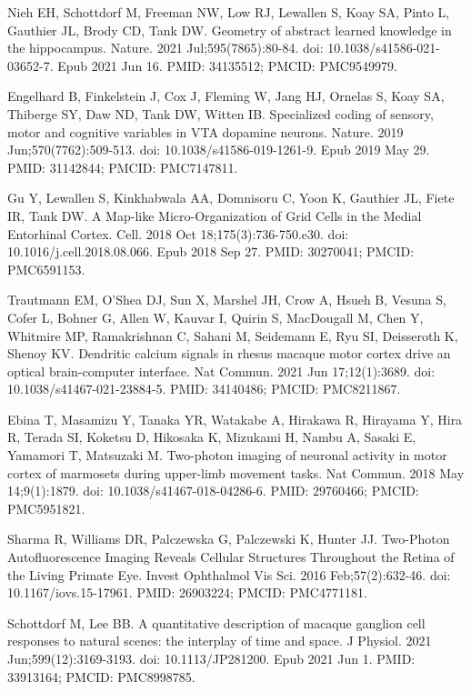 \documentclass[10pt,letterpaper]{article}
\begin{document}
\begin{thebibliography}{10}
Nieh EH, Schottdorf M, Freeman NW, Low RJ, Lewallen S, Koay SA, Pinto L, Gauthier JL, Brody CD, Tank DW. Geometry of abstract learned knowledge in the hippocampus. Nature. 2021 Jul;595(7865):80-84. doi: 10.1038/s41586-021-03652-7. Epub 2021 Jun 16. PMID: 34135512; PMCID: PMC9549979.

Engelhard B, Finkelstein J, Cox J, Fleming W, Jang HJ, Ornelas S, Koay SA, Thiberge SY, Daw ND, Tank DW, Witten IB. Specialized coding of sensory, motor and cognitive variables in VTA dopamine neurons. Nature. 2019 Jun;570(7762):509-513. doi: 10.1038/s41586-019-1261-9. Epub 2019 May 29. PMID: 31142844; PMCID: PMC7147811.

Gu Y, Lewallen S, Kinkhabwala AA, Domnisoru C, Yoon K, Gauthier JL, Fiete IR, Tank DW. A Map-like Micro-Organization of Grid Cells in the Medial Entorhinal Cortex. Cell. 2018 Oct 18;175(3):736-750.e30. doi: 10.1016/j.cell.2018.08.066. Epub 2018 Sep 27. PMID: 30270041; PMCID: PMC6591153.

Trautmann EM, O'Shea DJ, Sun X, Marshel JH, Crow A, Hsueh B, Vesuna S, Cofer L, Bohner G, Allen W, Kauvar I, Quirin S, MacDougall M, Chen Y, Whitmire MP, Ramakrishnan C, Sahani M, Seidemann E, Ryu SI, Deisseroth K, Shenoy KV. Dendritic calcium signals in rhesus macaque motor cortex drive an optical brain-computer interface. Nat Commun. 2021 Jun 17;12(1):3689. doi: 10.1038/s41467-021-23884-5. PMID: 34140486; PMCID: PMC8211867.

Ebina T, Masamizu Y, Tanaka YR, Watakabe A, Hirakawa R, Hirayama Y, Hira R, Terada SI, Koketsu D, Hikosaka K, Mizukami H, Nambu A, Sasaki E, Yamamori T, Matsuzaki M. Two-photon imaging of neuronal activity in motor cortex of marmosets during upper-limb movement tasks. Nat Commun. 2018 May 14;9(1):1879. doi: 10.1038/s41467-018-04286-6. PMID: 29760466; PMCID: PMC5951821.

Sharma R, Williams DR, Palczewska G, Palczewski K, Hunter JJ. Two-Photon Autofluorescence Imaging Reveals Cellular Structures Throughout the Retina of the Living Primate Eye. Invest Ophthalmol Vis Sci. 2016 Feb;57(2):632-46. doi: 10.1167/iovs.15-17961. PMID: 26903224; PMCID: PMC4771181.

Schottdorf M, Lee BB. A quantitative description of macaque ganglion cell responses to natural scenes: the interplay of time and space. J Physiol. 2021 Jun;599(12):3169-3193. doi: 10.1113/JP281200. Epub 2021 Jun 1. PMID: 33913164; PMCID: PMC8998785.


\end{thebibliography}
\end{document}
